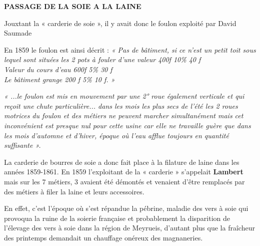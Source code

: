 
\begin{center}
    {\Large\bfseries PASSAGE DE LA SOIE A LA LAINE}
\end{center}

\vspace{0.55cm}

Jouxtant la « carderie de soie », il y avait donc le foulon exploité par David Saumade

\vspace{0.25cm}

En 1859 le foulon est ainsi décrit : \textit{« Pas de bâtiment, si ce n’est un petit toit sous
lequel sont situées les 2 pots à fouler d’une valeur 400f \hspace{0.5cm} 10\% \hspace{0.5cm} 40 f\\
Valeur du cours d’eau \hspace{2.1cm} 600f \hspace{0.5cm} 5\% \hspace{0.5cm} 30 f\\
Le bâtiment grange \hspace{2.4cm} 200 f \hspace{0.5cm} 5\% \hspace{0.5cm} 10 f. »}

\vspace{0.3cm}

\textit{« ...le foulon est mis en mouvement par une 2° roue également verticale et qui
reçoit une chute particulière... dans les mois les plus secs de l’été les 2 roues
motrices du foulon et des métiers ne peuvent marcher simultanément mais cet
inconvénient est presque nul pour cette usine car elle ne travaille guère que dans
les mois d’automne et d’hiver, époque où l’eau afflue toujours en quantité
suffisante ».}

\vspace{0.35cm}

La carderie de bourres de soie a donc fait place à la filature de laine dans les
années 1859-1861. En 1859 l’exploitant de la « carderie » s’appelait \textbf{Lambert}
mais sur les 7 métiers, 3 avaient été démontés et venaient d’être remplacés par
des métiers à filer la laine et leurs accessoires.

\vspace{0.35cm}

En effet, c’est l’époque où s’est répandue la pébrine, maladie des vers à soie qui
provoqua la ruine de la soierie française et probablement la disparition de
l’élevage des vers à soie dans la région de Meyrueis, d’autant plus que la
fraîcheur des printemps demandait un chauffage onéreux des magnaneries.

